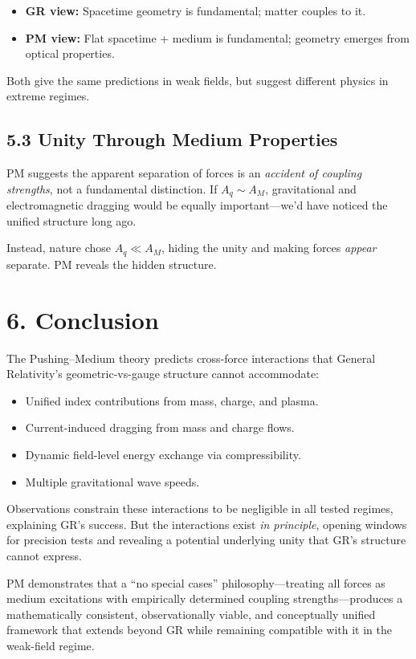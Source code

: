 \documentclass{article}
\begin{document}
\begin{itemize}
    \item \textbf{GR view:} Spacetime geometry is fundamental; matter couples to it.
    \item \textbf{PM view:} Flat spacetime + medium is fundamental; geometry emerges
          from optical properties.
\end{itemize}

Both give the same predictions in weak fields, but suggest different physics in
extreme regimes.

\subsection*{5.3 Unity Through Medium Properties}

PM suggests the apparent separation of forces is an \emph{accident of coupling
strengths}, not a fundamental distinction. If $A_q \sim A_M$, gravitational and
electromagnetic dragging would be equally important—we'd have noticed the
unified structure long ago.

Instead, nature chose $A_q \ll A_M$, hiding the unity and making forces
\emph{appear} separate. PM reveals the hidden structure.

\section*{6. Conclusion}

The Pushing--Medium theory predicts cross-force interactions that General
Relativity's geometric-vs-gauge structure cannot accommodate:

\begin{itemize}
    \item Unified index contributions from mass, charge, and plasma.
    \item Current-induced dragging from mass and charge flows.
    \item Dynamic field-level energy exchange via compressibility.
    \item Multiple gravitational wave speeds.
\end{itemize}

Observations constrain these interactions to be negligible in all tested
regimes, explaining GR's success. But the interactions exist \emph{in
principle}, opening windows for precision tests and revealing a potential
underlying unity that GR's structure cannot express.

PM demonstrates that a ``no special cases'' philosophy—treating all forces as
medium excitations with empirically determined coupling strengths—produces a
mathematically consistent, observationally viable, and conceptually unified
framework that extends beyond GR while remaining compatible with it in the
weak-field regime.
\end{document}
